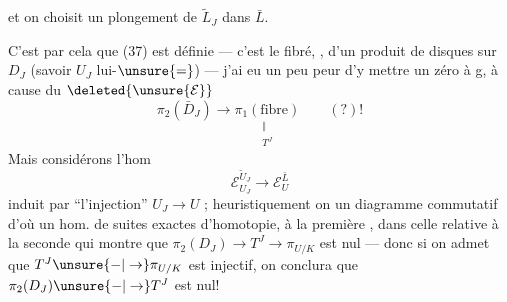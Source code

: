 
et on choisit un plongement de $\tilde L_J$ dans $\bar L$.

C'est par cela que (37) est définie --- c'est le  fibré, , d'un produit de disques sur $D_J$ (savoir $U_J$ lui-$\unsure{=}$) --- j'ai eu un peu peur d'y mettre un zéro à g, à cause du $\deleted{\unsure{\mathcal E}}$
\[
\pi_2(\bar D_J)\longrightarrow
\underset{\substack{\Vert\\ T^J}}{\pi_1(\text{fibre})}
\qquad (?)!
\]
Mais considérons l'hom
\[
\mathcal E_{U_J}^{\tilde U_J}\longrightarrow\mathcal E_U^{\bar L}
\]
induit par ``l'injection'' $U_J\longrightarrow U$ ;  heuristiquement on  un diagramme  commutatif
d'où un hom. de suites exactes d'homotopie,  à la première , dans celle relative à la seconde
qui montre que  $\pi_2(D_J)\longrightarrow T^J\longrightarrow\pi_{U/K}$ est nul --- donc si on admet que $T^J\unsure{-|\to}\pi_{U/K}$ est injectif, on conclura que $\pi_2(D_J)\unsure{-|\to}T^J$ est nul!

